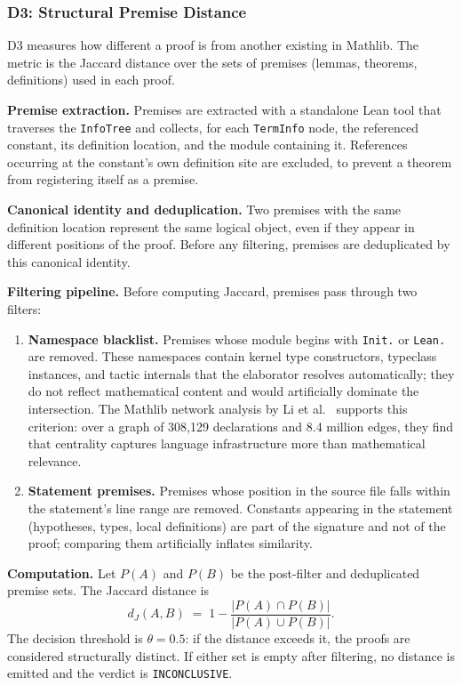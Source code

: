 \documentclass{article}
\theoremstyle{remark}
\begin{document}
\subsubsection{D3: Structural Premise Distance}

D3 measures how different a proof is from another existing in Mathlib. The metric is the Jaccard distance over the sets of premises (lemmas, theorems, definitions) used in each proof.

\textbf{Premise extraction.} Premises are extracted with a standalone Lean tool that traverses the \texttt{InfoTree} and collects, for each \texttt{TermInfo} node, the referenced constant, its definition location, and the module containing it. References occurring at the constant's own definition site are excluded, to prevent a theorem from registering itself as a premise.

\textbf{Canonical identity and deduplication.} Two premises with the same definition location represent the same logical object, even if they appear in different positions of the proof. Before any filtering, premises are deduplicated by this canonical identity.

\textbf{Filtering pipeline.} Before computing Jaccard, premises pass through two filters:

\begin{enumerate}
\item \textbf{Namespace blacklist.} Premises whose module begins with \texttt{Init.} or \texttt{Lean.} are removed. These namespaces contain kernel type constructors, typeclass instances, and tactic internals that the elaborator resolves automatically; they do not reflect mathematical content and would artificially dominate the intersection. The Mathlib network analysis by Li et al.~\cite{network2026} supports this criterion: over a graph of 308,129 declarations and 8.4 million edges, they find that centrality captures language infrastructure more than mathematical relevance.

\item \textbf{Statement premises.} Premises whose position in the source file falls within the statement's line range are removed. Constants appearing in the statement (hypotheses, types, local definitions) are part of the signature and not of the proof; comparing them artificially inflates similarity.
\end{enumerate}

\textbf{Computation.} Let $P(A)$ and $P(B)$ be the post-filter and deduplicated premise sets. The Jaccard distance is
\[
d_J(A,B) \;=\; 1 - \frac{|P(A) \cap P(B)|}{|P(A) \cup P(B)|}.
\]
The decision threshold is $\theta = 0.5$: if the distance exceeds it, the proofs are considered structurally distinct. If either set is empty after filtering, no distance is emitted and the verdict is \texttt{INCONCLUSIVE}.
\end{document}
